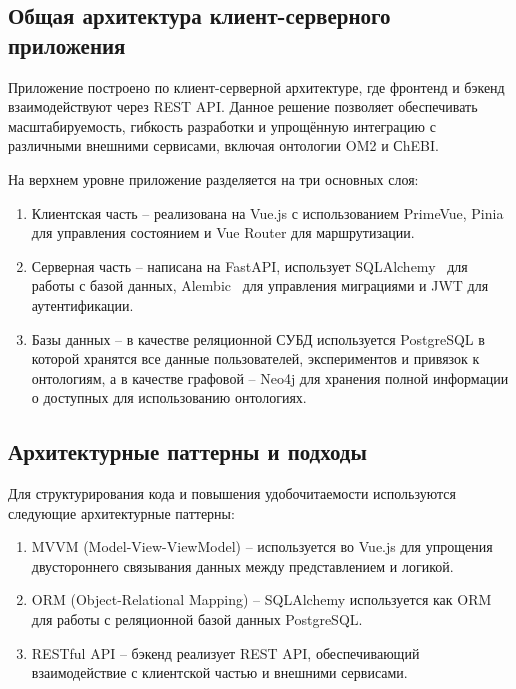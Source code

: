 \setcounter{section}{3}
\setcounter{subsection}{0}
 \label{sec: 3}

\subsection{Общая архитектура клиент-серверного приложения}

Приложение построено по клиент-серверной архитектуре, где фронтенд и бэкенд взаимодействуют через REST API. Данное решение позволяет обеспечивать масштабируемость, гибкость разработки и упрощённую интеграцию с различными внешними сервисами, включая онтологии OM2 и СhEBI.

На верхнем уровне приложение разделяется на три основных слоя:
\begin{enumerate}
    \item Клиентская часть -- реализована на Vue.js с использованием PrimeVue, Pinia для управления состоянием и Vue Router для маршрутизации.
    \item Серверная часть -- написана на FastAPI, использует SQLAlchemy~\cite{Library:SQLAlchemy} для работы с базой данных, Alembic~\cite{Library:Alembic} для управления миграциями и JWT для аутентификации.
    \item Базы данных -- в качестве реляционной СУБД используется PostgreSQL в которой хранятся все данные пользователей, экспериментов и привязок к онтологиям, а в качестве графовой -- Neo4j для хранения полной информации о доступных для использованию онтологиях.
\end{enumerate}



\subsection{Архитектурные паттерны и подходы}

Для структурирования кода и повышения удобочитаемости используются следующие архитектурные паттерны:

\begin{enumerate}
    \item MVVM (Model-View-ViewModel) -- используется во Vue.js для упрощения двустороннего связывания данных между представлением и логикой.
    \item ORM (Object-Relational Mapping) -- SQLAlchemy используется как ORM для работы с реляционной базой данных PostgreSQL.
    \item RESTful API -- бэкенд реализует REST API, обеспечивающий взаимодействие с клиентской частью и внешними сервисами.
\end{enumerate}

